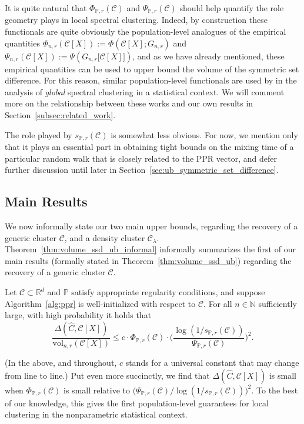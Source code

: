\documentclass[11pt,twoside]{article}
\newcommand{\Reals}{\mathbb{R}}
\newcommand{\1}{\mathbf{1}}
\newcommand{\Rd}{\Reals^d}
\newcommand{\mc}[1]{\mathcal{#1}}
\newcommand{\Pbb}{\mathbb{P}}
\newcommand{\wh}[1]{\widehat{#1}}
\newcommand{\vol}{\mathrm{vol}}
\begin{document}
It is quite natural that $\Phi_{\Pbb,r}(\mc{C})$ and $\Psi_{\Pbb,r}(\mc{C})$ should help quantify the role geometry plays in local spectral clustering. Indeed, by construction these functionals are quite obviously the population-level analogues of the empirical quantities $\Phi_{n,r}(\mc{C}[X]) := \Phi(\mc{C}[X];G_{n,r})$ and $\Psi_{n,r}(\mc{C}[X]) := \Psi(G_{n,r}\bigl[\mc{C}[X]\bigr])$, and as we have already mentioned, these empirical quantities can be used to upper bound the volume of the symmetric set difference. For this reason, similar population-level functionals are used by \cite{shi2009,schiebinger2015,garciatrillos19} in the analysis of \emph{global} spectral clustering in a statistical context. We will comment more on the relationship between these works and our own results in Section~\ref{subsec:related_work}. 

The role played by $s_{\Pbb,r}(\mc{C})$ is somewhat less obvious. For now, we mention only that it plays an essential part in obtaining tight bounds on the mixing time of a particular random walk that is closely related to the PPR vector, and defer further discussion until later in Section~\ref{sec:ub_symmetric_set_difference}.

\subsection{Main Results}
We now informally state our two main upper bounds, regarding the recovery of a generic cluster $\mc{C}$, and a density cluster $\mc{C}_{\lambda}$. Theorem~\ref{thm:volume_ssd_ub_informal} informally summarizes the first of our main results (formally stated in Theorem~\ref{thm:volume_ssd_ub}) regarding the recovery of a generic cluster $\mc{C}$.
\begin{theorem}[Informal]
	\label{thm:volume_ssd_ub_informal}
	Let $\mc{C} \subset \Rd$ and $\Pbb$ satisfy appropriate regularity conditions, and suppose Algorithm~\ref{alg:ppr} is well-initialized with respect to $\mc{C}$. For all $n \in \mathbb{N}$ sufficiently large, with high probability it holds that
	\begin{equation*}
	\frac{\Delta(\wh{C},\mc{C}[X])}{\vol_{n,r}(\mc{C}[X])} \leq c \cdot\Phi_{\Pbb,r}(\mc{C}) \cdot  \biggl(\frac{\log(1/s_{\Pbb,r}(\mc{C}))}{\Psi_{\Pbb,r}(\mc{C})}\biggr)^2.
	\end{equation*}
\end{theorem}
(In the above, and throughout, $c$ stands for a universal constant that may change from line to line.) Put even more succinctly, we find that $\Delta(\wh{C},\mc{C}[X])$ is small when $\Phi_{\Pbb,r}(\mc{C})$ is small relative to $\bigl(\Psi_{\Pbb,r}(\mc{C})/\log(1/s_{\Pbb,r}(\mc{C}))\bigr)^2$. To the best of our knowledge, this gives the first population-level guarantees for local clustering in the nonparametric statistical context.
\end{document}
